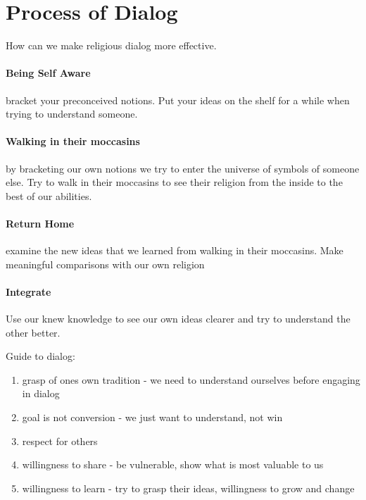 \documentclass{article}
\begin{document}
\section*{Process of Dialog}
\label{sec:process_of_dialogue}
How can we make religious dialog more effective.

\paragraph{Being Self Aware}
\label{par:being_self_aware}
bracket your preconceived notions. Put your ideas on the shelf for a while when trying to understand someone.

\paragraph{Walking in their moccasins}
\label{par:walking_in_their_moccasins}
by bracketing our own notions we try to enter the universe of symbols of someone else. Try to walk in their moccasins to see their religion from the inside to the best of our abilities.

\paragraph{Return Home}
\label{par:return_home}
examine the new ideas that we learned from walking in their moccasins. Make meaningful comparisons with our own religion

\paragraph{Integrate}
\label{par:integrate}
Use our knew knowledge to see our own ideas clearer and try to understand the other better.

Guide to dialog:
\begin{enumerate}
	\item grasp of ones own tradition - we need to understand ourselves before engaging in dialog
	\item goal is not conversion - we just want to understand, not win
	\item respect for others
	\item willingness to share - be vulnerable, show what is most valuable to us
	\item willingness to learn - try to grasp their ideas, willingness to grow and change
\end{enumerate}
\end{document}
